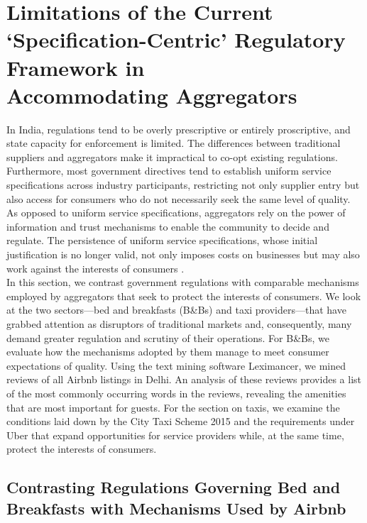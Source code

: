 \documentclass[a4paper, 12pt]{article}
\begin{document}
                    \section{Limitations of the Current ‘Specification-Centric’ Regulatory Framework in \\Accommodating Aggregators}
In India, regulations tend to be overly prescriptive or entirely proscriptive, and state capacity for enforcement is limited. The differences between traditional suppliers and aggregators make it impractical to co-opt existing regulations. Furthermore, most government directives tend to establish uniform service specifications across industry participants, restricting not only supplier entry but also access for consumers who do not necessarily seek the same level of quality. As opposed to uniform service specifications, aggregators rely on the power of information and trust mechanisms to enable the community to decide and regulate. The persistence of uniform service specifications, whose initial justification is no longer valid, not only imposes costs on businesses but may also work against the interests of consumers \parencite{koopman2014sharing}. \\  

In this section, we contrast government regulations with comparable mechanisms employed by aggregators that seek to protect the interests of consumers. We look at the two sectors—bed and breakfasts (B\&Bs) and taxi providers—that have grabbed attention as disruptors of traditional markets and, consequently, many demand greater regulation and scrutiny of their operations. For B\&Bs, we evaluate how the mechanisms adopted by them manage to meet consumer expectations of quality. Using the text mining software Leximancer, we mined reviews of all Airbnb listings in Delhi. An analysis of these reviews provides a list of the most commonly occurring words in the reviews, revealing the amenities that are most important for guests. For the section on taxis, we examine the conditions laid down by the City Taxi Scheme 2015 and the requirements under Uber that expand opportunities for service providers while, at the same time, protect the interests of consumers.\\                   
                    
           
                    \subsection{Contrasting Regulations Governing Bed and Breakfasts with Mechanisms Used by Airbnb}
\end{document}

